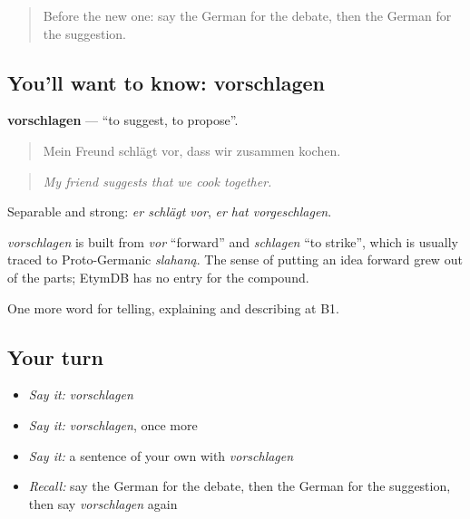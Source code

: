 \label{lesson:GE-C335-vorschlagen}



\begin{quote}
Before the new one: say the German for the debate, then the German for the suggestion.
\end{quote}

\subsection*{You'll want to know: vorschlagen}
\textbf{vorschlagen} — \textquotedblleft{}to suggest, to propose\textquotedblright{}.

\begin{quote}
Mein Freund schlägt vor, dass wir zusammen kochen.
\end{quote}

\begin{quote}
\emph{My friend suggests that we cook together.}
\end{quote}

Separable and strong: \emph{er schlägt vor}, \emph{er hat vorgeschlagen}.

\begin{cousinweb}
\emph{vorschlagen} is built from \emph{vor} \textquotedblleft{}forward\textquotedblright{} and \emph{schlagen} \textquotedblleft{}to strike\textquotedblright{}, which is usually traced to Proto-Germanic \emph{slahaną}. The sense of putting an idea forward grew out of the parts; EtymDB has no entry for the compound.
\end{cousinweb}

\begin{grammarlens}[title={What you've built}]
One more word for telling, explaining and describing at B1.
\end{grammarlens}

\subsection*{Your turn}
\begin{itemize}
\raggedright
  \item \emph{Say it:} \emph{vorschlagen}
  \item \emph{Say it:} \emph{vorschlagen}, once more
  \item \emph{Say it:} a sentence of your own with \emph{vorschlagen}
  \item \emph{Recall:} say the German for the debate, then the German for the suggestion, then say \emph{vorschlagen} again
\end{itemize}


